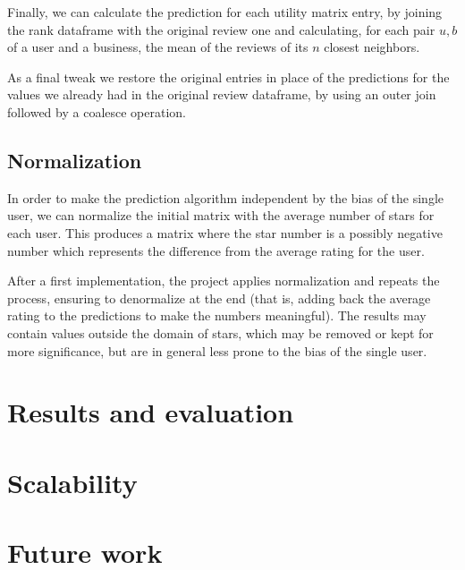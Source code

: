 \documentclass[11pt,a4paper]{article}
\begin{document}
\begin{multicols}{2}
Finally, we can calculate the prediction for each utility matrix entry, by joining the rank dataframe with the original review one and calculating, for each pair $u,b$ of a user and a business, the mean of the reviews of its $n$ closest neighbors.

As a final tweak we restore the original entries in place of the predictions for the values we already had in the original review dataframe, by using an outer join followed by a coalesce operation.


\subsection{Normalization}
In order to make the prediction algorithm independent by the bias of the single user, we can normalize the initial matrix with the average number of stars for each user.
This produces a matrix where the star number is a possibly negative number which represents the difference from the average rating for the user.

After a first implementation, the project applies normalization and repeats the process, ensuring to denormalize at the end (that is, adding back the average rating to the predictions to make the numbers meaningful).
The results may contain values outside the domain of stars, which may be removed or kept for more significance, but are in general less prone to the bias of the single user.


\label{evaluation}
\section{Results and evaluation}



\label{scalability}
\section{Scalability}



\label{futurework}
\section{Future work}


\end{multicols}
\end{document}
